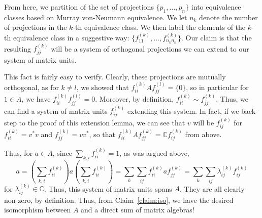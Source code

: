 \documentclass[aps,pra,showpacs,notitlepage,onecolumn,superscriptaddress,nofootinbib]{revtex4-1}
\theoremstyle{definition}
\newcommand{\hhrulefill}{\hspace{-1.5em} \hrulefill}
\begin{document}
\hhrulefill

From here, we partition of the set of projections $\{p_1, \dots, p_n\}$ into equivalence classes based on Murray von-Neumann equivalence.
We let $n_k$ denote the number of projections in the $k$-th equivalence class. We then label the elements of the $k$-th equivalence class in a suggestive way: $\{f_{11}^{(k)}, \dots, f_{n_k n_k}^{(k)}\}$.
Our claim is that the resulting $f_{jj}^{(k)}$ will be a system of orthogonal projections we can extend to our system of matrix units.

This fact is fairly easy to verify. Clearly, these projections are mutually orthogonal, as for $k \neq l$, we showed that $f_{ii}^{(k)} A f_{jj}^{(l)} = \{0\}$, so in particular for $1 \in A$,
we have $f_{ii}^{(k)} f_{jj}^{(l)} = 0$. Moreover, by definition, $f_{ii}^{(k)} \sim f_{jj}^{(k)}$. Thus, we can find a system of matrix units $f_{ij}^{(k)}$ extending this system. In fact,
if we back-step to the proof of this extension lemma, we can see that $v$ will be $f_{ij}^{(k)}$ for $f_{ii}^{(k)} = v^{*} v$ and $f_{jj}^{(k)} = v v^{*}$, so that $f_{ii}^{(k)} A f_{jj}^{(k)} = \mathbb{C} f_{ij}^{(k)}$
from above.

Thus, for $a \in A$, since $\sum_{k, i} f_{ii}^{(k)} = 1$, as was argued above,
\begin{equation}
  a = \left( \sum_{k, i} f_{ii}^{(k)} \right) a \left( \sum_{k, i} f_{ii}^{(k)} \right) = \sum_{k} \sum_{ij} f_{ii}^{(k)} a f_{jj}^{(k)} = \sum_{k} \sum_{ij} \lambda_{ij}^{(k)} f_{ij}^{(k)}
\end{equation}
for $\lambda_{ij}^{(k)} \in \mathbb{C}$. Thus, this system of matrix units spans $A$. They are all clearly non-zero, by definition. Thus, from Claim~\ref{claim:iso}, we have the desired isomorphism between
$A$ and a direct sum of matrix algebras!
\end{document}
